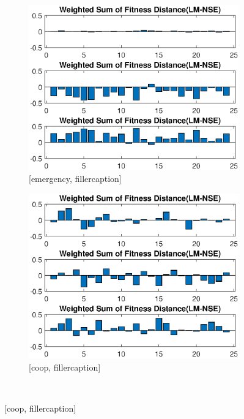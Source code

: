 \begin{figure}[ht]

\begin{subfigure}{0.55\linewidth}
	\centering
	\includegraphics[scale=0.6]{figures/c_sim_results/emer_weighted_sumFitness.eps}
	\caption{[emergency, fillercaption]}
	\label{fig:cSimWeightEmer}
\end{subfigure}%
\begin{subfigure}{0.55\linewidth}
	\centering
	\includegraphics[scale=0.6]{figures/c_sim_results/coop_weighted_sumFitness.eps}
	\caption{[coop, fillercaption]}
	\label{fig:cSimWeightCoop}
\end{subfigure}\\

\end{figure}
